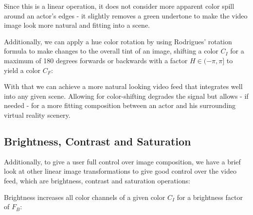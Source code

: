 


Since this is a linear operation, it does not consider more apparent color 
spill around an actor's edges - it slightly removes a green undertone to make 
the video image look more natural and fitting into a scene.

Additionally, we can apply a hue color rotation by using Rodrigues' rotation 
formula to make changes to the overall tint of an image, shifting a color $C_I$ 
for a maximum of 180 degrees forwards or backwards with a factor $H \in (-\pi, 
\pi]$ to yield a color $C_F$:


With that we can achieve a more natural looking video feed that integrates well 
into any given scene. Allowing for color-shifting degrades the signal but 
allows - if needed - for a more fitting composition between an actor and his 
surrounding virtual reality scenery.

\subsection{Brightness, Contrast and Saturation}

Additionally, to give a user full control over image composition, we have a 
brief look at other linear image transformations to give good control over the 
video feed, which are brightness, contrast and saturation operations:

Brightness increases all color channels of a given color $C_I$ for a brightness 
factor of $F_B$:


